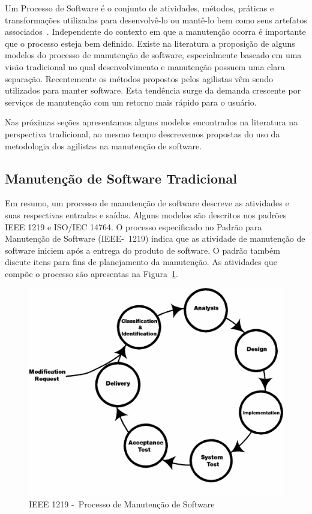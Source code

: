 Um Processo de Software é o conjunto de atividades, métodos, práticas e
transformações utilizadas para desenvolvê-lo ou mantê-lo bem como seus artefatos
associados~\cite{paulk1993key}. Independente do contexto em que a manutenção
ocorra é importante que o processo esteja bem definido. Existe na literatura a
proposição de alguns modelos do processo de manutenção de software,
especialmente baseado em uma visão tradicional no qual desenvolvimento e
manutenção possuem uma clara separação. Recentemente os métodos propostos pelos
agilistas vêm sendo utilizados para manter software. Esta tendência surge da
demanda crescente por serviços de manutenção com um retorno mais rápido para o
usuário.

Nas próximas seções apresentamos alguns modelos encontrados na literatura na
perspectiva tradicional, ao mesmo tempo descrevemos propostas do uso da
metodologia dos agilistas na manutenção de software.

\subsection{Manutenção de Software Tradicional}
\label{subsec:manutenção_de_software_tradicional}

Em resumo, um processo de manutenção de software descreve as atividades e suas
respectivas entradas e saídas. Alguns modelos são descritos nos padrões IEEE
1219 e ISO/IEC 14764. O processo especificado no Padrão para Manutenção de
Software (IEEE-~1219) indica que as atividade de manutenção de software iniciem
após a entrega do produto de software. O padrão também discute itens para fins
de planejamento da manutenção. As atividades que compõe o processo são
apresentas na Figura~\ref{fig:ieee-1219-processo-man-software}.

\begin{figure}[htpb] \centering
	\includegraphics[width=0.7\linewidth]
	{chapter-manutencao-software-visao-geral/img/ieee-1219-98-processo-manutencao.png}
	\caption{IEEE 1219 -~Processo de Manutenção de Software}
	\label{fig:ieee-1219-processo-man-software} \end{figure}

